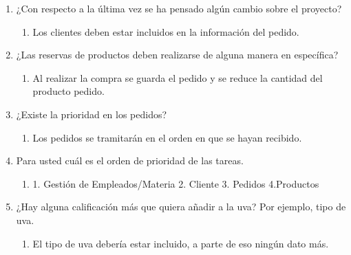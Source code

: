\begin{enumerate}
    \item ¿Con respecto a la última vez se ha pensado algún cambio sobre el proyecto?
    \begin{enumerate}
        \item Los clientes deben estar incluidos en la información del pedido.
    \end{enumerate}

    \item ¿Las reservas de productos deben realizarse de alguna manera en específica?
    \begin{enumerate}
        \item Al realizar la compra se guarda el pedido y se reduce la cantidad del producto pedido.
    \end{enumerate}

    \item ¿Existe la prioridad en los pedidos?
    \begin{enumerate}
        \item Los pedidos se tramitarán en el orden en que se hayan recibido.
    \end{enumerate}

    \item Para usted cuál es el orden de prioridad de las tareas.
    \begin{enumerate}
        \item 1. Gestión de Empleados/Materia 2. Cliente 3. Pedidos 4.Productos
    \end{enumerate}

    \item ¿Hay alguna calificación más que quiera añadir a la uva? Por ejemplo, tipo de uva.
    \begin{enumerate}
        \item El tipo de uva debería estar incluido, a parte de eso ningún dato más. 
    \end{enumerate}
\end{enumerate}
